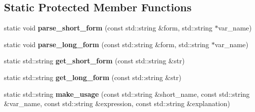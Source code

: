 \subsection*{Static Protected Member Functions}
\begin{DoxyCompactItemize}
\item 
\hypertarget{classskl_1_1_opt_parser_acd1bb930b4330c4d29a294537b874f01}{}\label{classskl_1_1_opt_parser_acd1bb930b4330c4d29a294537b874f01} 
static void {\bfseries parse\+\_\+short\+\_\+form} (const std\+::string \&form, std\+::string $\ast$var\+\_\+name)
\item 
\hypertarget{classskl_1_1_opt_parser_ab56f6bdd5af0b74ce57ef739fe6f7671}{}\label{classskl_1_1_opt_parser_ab56f6bdd5af0b74ce57ef739fe6f7671} 
static void {\bfseries parse\+\_\+long\+\_\+form} (const std\+::string \&form, std\+::string $\ast$var\+\_\+name)
\item 
\hypertarget{classskl_1_1_opt_parser_a33940c3ac37e2493bf0f4b0e3808794f}{}\label{classskl_1_1_opt_parser_a33940c3ac37e2493bf0f4b0e3808794f} 
static std\+::string {\bfseries get\+\_\+short\+\_\+form} (const std\+::string \&str)
\item 
\hypertarget{classskl_1_1_opt_parser_a4204efe57580846f70fffbd9a6323569}{}\label{classskl_1_1_opt_parser_a4204efe57580846f70fffbd9a6323569} 
static std\+::string {\bfseries get\+\_\+long\+\_\+form} (const std\+::string \&str)
\item 
\hypertarget{classskl_1_1_opt_parser_a712f0d6b2d077b45651b252bc6b12da2}{}\label{classskl_1_1_opt_parser_a712f0d6b2d077b45651b252bc6b12da2} 
static std\+::string {\bfseries make\+\_\+usage} (const std\+::string \&short\+\_\+name, const std\+::string \&var\+\_\+name, const std\+::string \&expression, const std\+::string \&explanation)
\end{DoxyCompactItemize}
